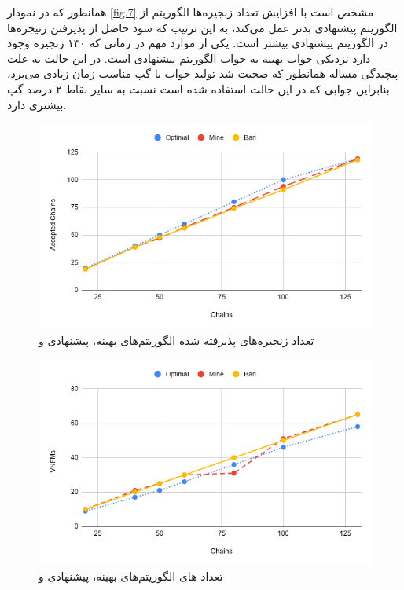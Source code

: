 همانطور که در نمودار \ref{fig.7} مشخص است با افزایش تعداد زنجیره‌ها الگوریتم \cite{Bari2015} از الگوریتم پیشنهادی بدتر عمل می‌کند،
به این ترتیب که سود حاصل از پذیرفتن زنیجره‌ها در الگوریتم پیشنهادی بیشتر است.
یکی از موارد مهم در زمانی که ۱۳۰ زنجیره وجود دارد نزدیکی جواب بهینه به جواب الگوریتم پیشنهادی است.
در این حالت به علت پیچیدگی مساله همانطور که صحبت شد تولید جواب با گپ مناسب زمان زیادی می‌برد،
بنابراین جوابی که در این حالت استفاده شده است نسبت به سایر نقاط ۲ درصد گپ بیشتری دارد.


\begin{figure}[h]
\center\includegraphics[scale=.5]{images/chart-3}
\caption{تعداد زنجیره‌های پذیرفته شده الگوریتم‌های بهینه، پیشنهادی و \cite{Bari2015}}
\label{fig.8}
\end{figure}

\begin{figure}[h]
\center\includegraphics[scale=.5]{images/chart-4}
\caption{تعداد های الگوریتم‌های بهینه، پیشنهادی و \cite{Bari2015}}
\label{fig.9}
\end{figure}

